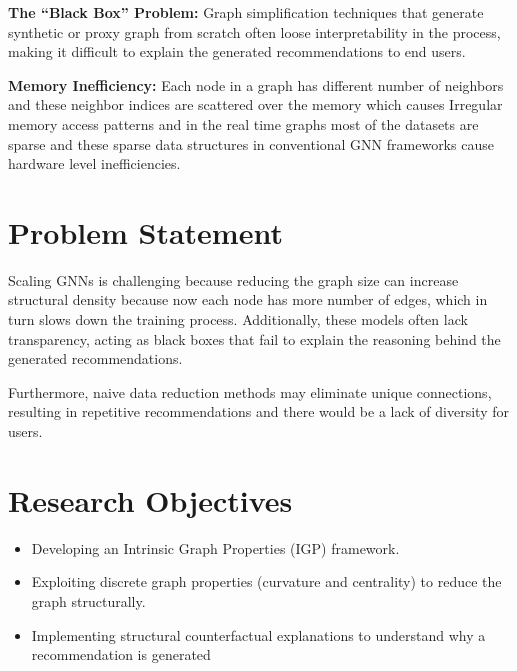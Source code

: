 \textbf{The ``Black Box'' Problem:}  
Graph simplification techniques that generate synthetic or proxy graph from scratch often loose interpretability in the process, making it difficult to explain the generated recommendations to end users.

\textbf{Memory Inefficiency:}  
Each node in a graph has different number of neighbors and these neighbor indices are scattered over the memory which causes Irregular memory access patterns and in the real time graphs most of the datasets are sparse and these sparse data structures in conventional GNN frameworks cause hardware level inefficiencies.

\section{Problem Statement}

Scaling GNNs is challenging because reducing the graph size can increase structural
density because now each node has more number of edges, which in turn slows down the training process. Additionally, these models often lack transparency, acting as black boxes that fail to explain the reasoning behind the generated recommendations.

Furthermore, naive data reduction methods may eliminate unique connections, resulting in repetitive recommendations and there would be a lack of diversity for users.

\section{Research Objectives}
\begin{itemize}
    \item Developing an Intrinsic Graph Properties (IGP) framework.
    \item Exploiting discrete graph properties (curvature and centrality) to reduce the graph structurally.
    \item Implementing structural counterfactual explanations to understand why a recommendation is generated

\end{itemize}



